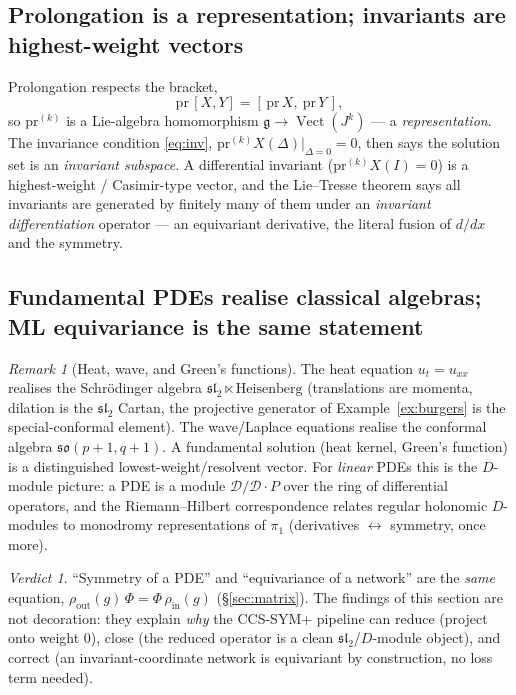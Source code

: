 \documentclass[11pt]{article}
\theoremstyle{definition}
\theoremstyle{remark}
\newtheorem{remark}{Remark}[section]
\newtheorem*{verdict}{Verdict}
\newcommand{\g}{\mathfrak{g}}
\newcommand{\Vect}{\operatorname{Vect}}
\newcommand{\sltwo}{\mathfrak{sl}_2}
\begin{document}
\subsection{Prolongation is a representation; invariants are highest-weight vectors}

Prolongation respects the bracket,
\[
\mathrm{pr}\,[X,Y]=[\,\mathrm{pr}\,X,\ \mathrm{pr}\,Y\,],
\]
so $\mathrm{pr}^{(k)}$ is a Lie-algebra homomorphism $\g\to\Vect(J^k)$ --- a \emph{representation}. The
invariance condition \eqref{eq:inv}, $\mathrm{pr}^{(k)}X(\Delta)|_{\Delta=0}=0$, then says the solution
set is an \emph{invariant subspace}. A differential invariant ($\mathrm{pr}^{(k)}X(I)=0$) is a
highest-weight / Casimir-type vector, and the Lie--Tresse theorem says all invariants are generated by
finitely many of them under an \emph{invariant differentiation} operator --- an equivariant derivative,
the literal fusion of $d/dx$ and the symmetry.

\subsection{Fundamental PDEs realise classical algebras; ML equivariance is the same statement}

\begin{remark}[Heat, wave, and Green's functions]
The heat equation $u_t=u_{xx}$ realises the Schr\"odinger algebra $\sltwo\ltimes\text{Heisenberg}$
(translations are momenta, dilation is the $\sltwo$ Cartan, the projective generator of
Example~\ref{ex:burgers} is the special-conformal element). The wave/Laplace equations realise the
conformal algebra $\mathfrak{so}(p+1,q+1)$. A fundamental solution (heat kernel, Green's function) is a
distinguished lowest-weight/resolvent vector. For \emph{linear} PDEs this is the $D$-module picture: a
PDE is a module $\mathcal{D}/\mathcal{D}\!\cdot\!P$ over the ring of differential operators, and the
Riemann--Hilbert correspondence relates regular holonomic $D$-modules to monodromy representations of
$\pi_1$ (derivatives $\leftrightarrow$ symmetry, once more).
\end{remark}

\begin{verdict}
``Symmetry of a PDE'' and ``equivariance of a network'' are the \emph{same} equation,
$\rho_{\mathrm{out}}(g)\,\Phi=\Phi\,\rho_{\mathrm{in}}(g)$ (\S\ref{sec:matrix}). The findings of this
section are not decoration: they explain \emph{why} the CCS-SYM+ pipeline can reduce (project onto
weight $0$), close (the reduced operator is a clean $\sltwo$/$D$-module object), and correct (an
invariant-coordinate network is equivariant by construction, no loss term needed).
\end{verdict}
\end{document}
